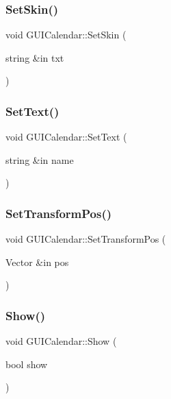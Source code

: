 \subsubsection{\texorpdfstring{Set\+Skin()}{SetSkin()}}
{\footnotesize\ttfamily void G\+U\+I\+Calendar\+::\+Set\+Skin (\begin{DoxyParamCaption}\item[{string \&in}]{txt }\end{DoxyParamCaption})}

\hypertarget{class_g_u_i_calendar_a0a48b35472a2d11647c7276c0a759d38}{}\label{class_g_u_i_calendar_a0a48b35472a2d11647c7276c0a759d38} 
\subsubsection{\texorpdfstring{Set\+Text()}{SetText()}}
{\footnotesize\ttfamily void G\+U\+I\+Calendar\+::\+Set\+Text (\begin{DoxyParamCaption}\item[{string \&in}]{name }\end{DoxyParamCaption})}

\hypertarget{class_g_u_i_calendar_a3b9c5ec2417622452450550dd02273bf}{}\label{class_g_u_i_calendar_a3b9c5ec2417622452450550dd02273bf} 
\subsubsection{\texorpdfstring{Set\+Transform\+Pos()}{SetTransformPos()}}
{\footnotesize\ttfamily void G\+U\+I\+Calendar\+::\+Set\+Transform\+Pos (\begin{DoxyParamCaption}\item[{Vector \&in}]{pos }\end{DoxyParamCaption})}

\hypertarget{class_g_u_i_calendar_a5f83aede949ec4c075fb3ba872a26a64}{}\label{class_g_u_i_calendar_a5f83aede949ec4c075fb3ba872a26a64} 
\subsubsection{\texorpdfstring{Show()}{Show()}}
{\footnotesize\ttfamily void G\+U\+I\+Calendar\+::\+Show (\begin{DoxyParamCaption}\item[{bool}]{show }\end{DoxyParamCaption})}




